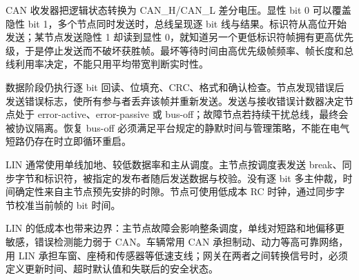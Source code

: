 
CAN 收发器把逻辑状态转换为 CAN\_H/CAN\_L 差分电压。显性 bit 0 可以覆盖隐性 bit 1，多个节点同时发送时，总线呈现逐 bit 线与结果。标识符从高位开始发送；某节点发送隐性 1 却读到显性 0，就知道另一个更低标识符帧拥有更高优先级，于是停止发送而不破坏获胜帧。最坏等待时间由高优先级帧频率、帧长度和总线利用率决定，不能只用平均带宽判断实时性。

数据阶段仍执行逐 bit 回读、位填充、CRC、格式和确认检查。节点发现错误后发送错误标志，使所有参与者丢弃该帧并重新发送。发送与接收错误计数器决定节点处于 error-active、error-passive 或 bus-off；故障节点若持续干扰总线，最终会被协议隔离。恢复 bus-off 必须满足平台规定的静默时间与管理策略，不能在电气短路仍存在时立即循环重启。


LIN 通常使用单线加地、较低数据率和主从调度。主节点按调度表发送 break、同步字节和标识符，被指定的发布者随后发送数据与校验。没有逐 bit 多主仲裁，时间确定性来自主节点预先安排的时隙。节点可使用低成本 RC 时钟，通过同步字节校准当前帧的 bit 时间。

LIN 的低成本也带来边界：主节点故障会影响整条调度，单线对短路和地偏移更敏感，错误检测能力弱于 CAN。车辆常用 CAN 承担制动、动力等高可靠网络，用 LIN 承担车窗、座椅和传感器等低速支线；网关在两者之间转换信号时，必须定义更新时间、超时默认值和失联后的安全状态。
